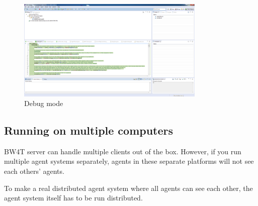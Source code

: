 \documentclass[11pt,a4paper]{article}
\begin{document}
\begin{figure}
  \begin{center}
    \includegraphics[width=0.8\textwidth]{debugmode.png}
    \caption{Debug mode}\label{fig:Eclipse}
  \end{center}
\end{figure}



\subsection{Running on multiple computers}
BW4T server can handle multiple clients out of the box. However, if you run multiple agent systems separately, agents in these separate platforms will not see each others' agents. 

To make a real distributed agent system where all agents can see each other, the agent system itself has to be run distributed. 
\end{document}
